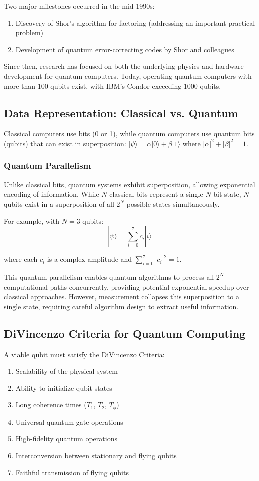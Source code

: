 \documentclass{article}
\begin{document}
Two major milestones occurred in the mid-1990s:
\begin{enumerate}
    \item Discovery of Shor's algorithm for factoring (addressing an important practical problem)
    \item Development of quantum error-correcting codes by Shor and colleagues
\end{enumerate}

Since then, research has focused on both the underlying physics and hardware development for quantum computers. Today, operating quantum computers with more than 100 qubits exist, with IBM's Condor exceeding 1000 qubits.

\subsection{Data Representation: Classical vs. Quantum}

Classical computers use bits (0 or 1), while quantum computers use quantum bits (qubits) that can exist in superposition: $|\psi\rangle = \alpha|0\rangle + \beta|1\rangle$ where $|\alpha|^2 + |\beta|^2 = 1$.

\subsubsection*{Quantum Parallelism}

Unlike classical bits, quantum systems exhibit superposition, allowing exponential encoding of information. While $N$ classical bits represent a single $N$-bit state, $N$ qubits exist in a superposition of all $2^N$ possible states simultaneously.

For example, with $N=3$ qubits:
$$|\psi\rangle = \sum_{i=0}^{7} c_i|i\rangle$$

where each $c_i$ is a complex amplitude and $\sum_{i=0}^{7}|c_i|^2 = 1$.

This quantum parallelism enables quantum algorithms to process all $2^N$ computational paths concurrently, providing potential exponential speedup over classical approaches. However, measurement collapses this superposition to a single state, requiring careful algorithm design to extract useful information.

\subsection{DiVincenzo Criteria for Quantum Computing}
A viable qubit must satisfy the DiVincenzo Criteria:
\begin{enumerate}
    \item Scalability of the physical system
    \item Ability to initialize qubit states
    \item Long coherence times ($T_1$, $T_2$, $T_\phi$)
    \item Universal quantum gate operations
    \item High-fidelity quantum operations
    \item Interconversion between stationary and flying qubits
    \item Faithful transmission of flying qubits
\end{enumerate}
\end{document}
